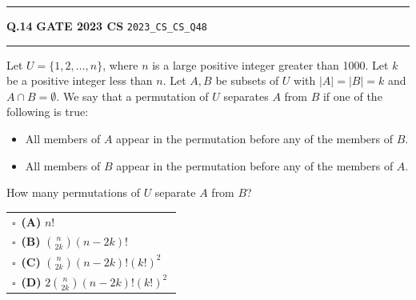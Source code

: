 \documentclass[a4paper,10pt]{article}
\begin{document}
\vspace{6pt}\hrule height 0.35pt\vspace{6pt}
\noindent
\begin{tcolorbox}[
    blanker,
    sidebyside,
    sidebyside align=top,
    lefthand width=0.55\textwidth,
    top=4pt, bottom=4pt, left=0pt, right=0pt,
    middle=16pt,
    underlay={
        \draw[dashed, black!80, line width=0.8pt, dash pattern=on 4pt off 3pt]
            ([xshift=0.55\textwidth+8pt]frame.north west) --
            ([xshift=0.55\textwidth+8pt]frame.south west);
    }
]
\textbf{Q.14}  \hfill {\footnotesize\textbf{GATE 2023 CS} \quad \tiny\texttt{2023\_CS\_CS\_Q48}}
\vspace{2pt}\hrule height 0.3pt\vspace{4pt}

Let $U = \{1, 2, \dots, n\}$, where $n$ is a large positive integer greater than 1000. Let $k$ be a positive integer less than $n$. Let $A, B$ be subsets of $U$ with $|A| = |B| = k$ and $A \cap B = \emptyset$. We say that a permutation of $U$ separates $A$ from $B$ if one of the following is true:
\begin{itemize}[itemsep=0pt,topsep=2pt]
\item All members of $A$ appear in the permutation before any of the members of $B$.
\item All members of $B$ appear in the permutation before any of the members of $A$.
\end{itemize}
How many permutations of $U$ separate $A$ from $B$?

\par\vspace{6pt}\noindent
\begin{tabular}{@{}p{0.98\linewidth}@{}}
$\square$\ \textbf{(A)} $n!$ \\
\addlinespace[3pt]
$\square$\ \textbf{(B)} $\binom{n}{2k} (n - 2k)!$ \\
\addlinespace[3pt]
$\square$\ \textbf{(C)} $\binom{n}{2k} (n - 2k)! (k!)^2$ \\
\addlinespace[3pt]
$\square$\ \textbf{(D)} $2 \binom{n}{2k} (n - 2k)! (k!)^2$
\end{tabular}

\tcblower


\end{tcolorbox}
\end{document}
